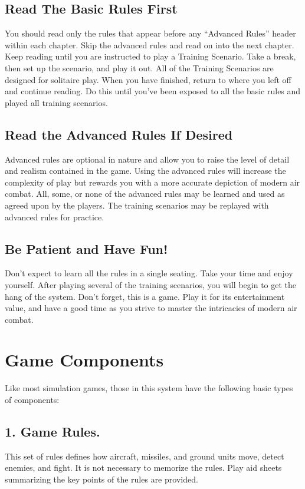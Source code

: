 \subsection{Read The Basic Rules First} You should read only the rules that appear before any “Advanced Rules” header within each chapter. Skip the advanced rules and read on into the next chapter. Keep reading until you are instructed to play a Training Scenario. Take a break, then set up the scenario, and play it out. All of the Training Scenarios are designed for solitaire play. When you have finished, return to where you left off and continue reading. Do this until you’ve been exposed to all the basic rules and played all training scenarios.

\subsection{Read the Advanced Rules If Desired} Advanced rules are optional in nature and allow you to raise the level of detail and realism contained in the game. Using the advanced rules will increase the complexity of play but rewards you with a more accurate depiction of modern air combat. All, some, or none of the advanced rules may be learned and used as agreed upon by the players. The training scenarios may be replayed with advanced rules for practice.

\subsection{Be Patient and Have Fun!} Don’t expect to learn all the rules in a single seating. Take your time and enjoy yourself. After playing several of the training scenarios, you will begin to get the hang of the system. Don’t forget, this is a game. Play it for its entertainment value, and have a good time as you strive to master the intricacies of modern air combat.

\section{Game Components}

Like most simulation games, those in this system have the following basic types of components:

\subsection{1. Game Rules.} This set of rules defines how aircraft, missiles, and ground units move, detect enemies, and fight. It is not necessary to memorize the rules. Play aid sheets summarizing the key points of the rules are provided.

